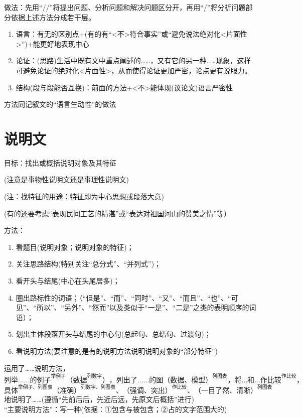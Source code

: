 做法：先用``//''将提出问题、分析问题和解决问题区分开，再用``/''将分析问题部分依据上述方法分成若干层。

\begin{enumerate}
\item 语言：有无的区别点+(有的有``<不>符合事实''或``避免说法绝对化<片面性>'')+能更好地表现中心
\item 论证：(思路)生活中既有文中重点阐述的\ldots{}\ldots{}，又有它的另一种\ldots{}\ldots{}现象，这样可避免论证的绝对化<片面性>，从而使得论证更加严密，论点更有说服力。
\item 结构(段与段能否互换)：前面的方法+<不>能体现(议论文)语言严密性
\end{enumerate}

  方法同记叙文的``语言生动性''的做法

\section{说明文}

目标：找出或概括说明对象及其特征

(注意是事物性说明文还是事理性说明文)

(注：找特征的用途：特征即为中心思想或段落大意)

(有的还要考虑``表现民间工艺的精湛''或``表达对祖国河山的赞美之情''等）

方法：\begin{enumerate}\item 看题目(说明对象；说明对象的特征)；
        \item 关注思路结构(特别关注``总分式''、``并列式'')；
        \item 看开头与结尾(中心在头尾居多)；
        \item 圈出路标性的词语；（``但是''、``而''、``同时''、``又''、``而且''、``也''、``可见''、``所以''、``另外''、``然而''以及类似于``一是''、``二是''之类的表明顺序的词语）；
        \item 划出主体段落开头与结尾的中心句(总起句、总结句、过渡句)；
        \item 看说明方法(要注意的是有的说明方法说明说明对象的``部分特征'')\end{enumerate}

运用了\ldots{}\ldots{}说明方法，\\
\[列举\ldots{}\ldots{}的例子^{举例子}（数据^{列数字}），列出了\ldots{}\ldots{}的图（数据、模型）^{列图表}，将\ldots{}和\ldots{}作比较^{作比较}，\]
\[具体^{举例子、列图表}（准确）^{列数字、列图表}、（强调、突出）^{作比较}、（一目了然、清晰）^{列图表}\]
地说明了\ldots{}\ldots{}(遵循``先前后后，先近后远，先原文后概括''进行)\\
``主要说明方法''：写一种(依据：①包含与被包含；②占的文字范围大的)\\
\\
\\
\\
\\

